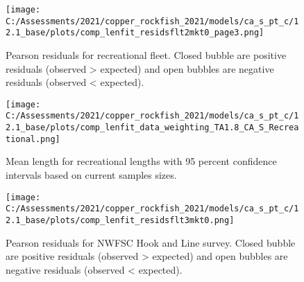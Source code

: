 \documentclass[11pt,
  english,
  a4paper,
]{article}
\begin{document}
\tagmcend\tagstructend


\begin{figure}
\centering
\texttt{[image: C:/Assessments/2021/copper\_rockfish\_2021/models/ca\_s\_pt\_c/12.1\_base/plots/comp\_lenfit\_residsflt2mkt0\_page3.png]}
\caption{Pearson residuals for recreational fleet. Closed bubble are positive residuals (observed \textgreater{} expected) and open bubbles are negative residuals (observed \textless{} expected).\label{fig:rec-pearson}}
\end{figure}

\tagmcend\tagstructend


\begin{figure}
\centering
\texttt{[image: C:/Assessments/2021/copper\_rockfish\_2021/models/ca\_s\_pt\_c/12.1\_base/plots/comp\_lenfit\_data\_weighting\_TA1.8\_CA\_S\_Recreational.png]}
\caption{Mean length for recreational lengths with 95 percent confidence intervals based on current samples sizes.\label{fig:rec-mean-len-fit}}
\end{figure}

\tagmcend\tagstructend


\begin{figure}
\centering
\texttt{[image: C:/Assessments/2021/copper\_rockfish\_2021/models/ca\_s\_pt\_c/12.1\_base/plots/comp\_lenfit\_residsflt3mkt0.png]}
\caption{Pearson residuals for NWFSC Hook and Line survey. Closed bubble are positive residuals (observed \textgreater{} expected) and open bubbles are negative residuals (observed \textless{} expected).\label{fig:hkl-pearson}}
\end{figure}

\tagmcend\tagstructend

\end{document}
